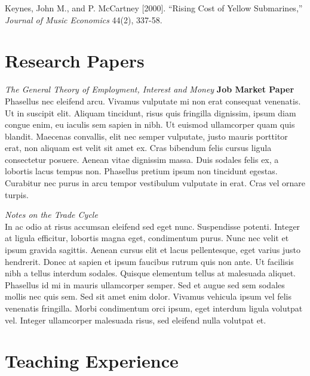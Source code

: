 \documentclass[11pt]{res} %
\begin{document}
\begin{resume}
Keynes, John M., and P. McCartney [2000]. ``Rising Cost of Yellow Submarines,'' \emph{Journal of Music Economics} 44(2), 337-58.\par

\section{Research Papers}
\vspace{6pt}%

\emph{The General Theory of Employment, Interest and Money} \hfill \textbf{Job Market Paper}  \\
Phasellus nec eleifend arcu. Vivamus vulputate mi non erat consequat venenatis. Ut in suscipit elit. Aliquam tincidunt, risus quis fringilla dignissim, ipsum diam congue enim, eu iaculis sem sapien in nibh. Ut euismod ullamcorper quam quis blandit. Maecenas convallis, elit nec semper vulputate, justo mauris porttitor erat, non aliquam est velit sit amet ex. Cras bibendum felis cursus ligula consectetur posuere. Aenean vitae dignissim massa. Duis sodales felis ex, a lobortis lacus tempus non. Phasellus pretium ipsum non tincidunt egestas. Curabitur nec purus in arcu tempor vestibulum vulputate in erat. Cras vel ornare turpis. \par

\vspace{6pt} %

\emph{Notes on the Trade Cycle}      \hfill   \\
In ac odio at risus accumsan eleifend sed eget nunc. Suspendisse potenti. Integer at ligula efficitur, lobortis magna eget, condimentum purus. Nunc nec velit et ipsum gravida sagittis. Aenean cursus elit et lacus pellentesque, eget varius justo hendrerit. Donec at sapien et ipsum faucibus rutrum quis non ante. Ut facilisis nibh a tellus interdum sodales. Quisque elementum tellus at malesuada aliquet. Phasellus id mi in mauris ullamcorper semper. Sed et augue sed sem sodales mollis nec quis sem. Sed sit amet enim dolor. Vivamus vehicula ipsum vel felis venenatis fringilla. Morbi condimentum orci ipsum, eget interdum ligula volutpat vel. Integer ullamcorper malesuada risus, sed eleifend nulla volutpat et. \par


\section{Teaching Experience}
\vspace{6pt}%


\end{resume}
\end{document}
